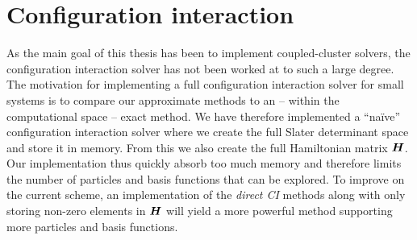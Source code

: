     \section{Configuration interaction}
        As the main goal of this thesis has been to implement coupled-cluster
        solvers, the configuration interaction solver has not been worked at to
        such a large degree.
        The motivation for implementing a full configuration interaction solver
        for small systems is to compare our approximate methods to an -- within
        the computational space -- exact method.
        We have therefore implemented a ``naïve'' configuration interaction
        solver where we create the full Slater determinant space and store it in
        memory.
        From this we also create the full Hamiltonian matrix $\boldsymbol{H}$.
        Our implementation thus quickly absorb too much memory and therefore
        limits the number of particles and basis functions that can be explored.
        To improve on the current scheme, an implementation of the \emph{direct
        CI} methods \cite{helgaker-molecular, olsen2012full} along with only
        storing non-zero elements in $\boldsymbol{H}$ will yield a more powerful
        method supporting more particles and basis functions.

